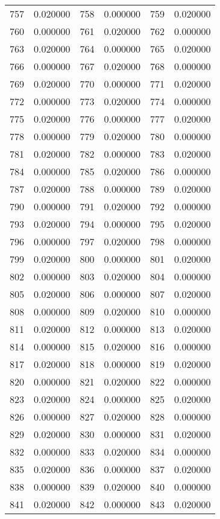 \documentclass[12pt]{article}
\begin{document}
\begin{longtable}{@{}cc|cc|cc@{}}
757 & 0.020000 & 758 & 0.000000 & 759 & 0.020000 \\
760 & 0.000000 & 761 & 0.020000 & 762 & 0.000000 \\
763 & 0.020000 & 764 & 0.000000 & 765 & 0.020000 \\
766 & 0.000000 & 767 & 0.020000 & 768 & 0.000000 \\
769 & 0.020000 & 770 & 0.000000 & 771 & 0.020000 \\
772 & 0.000000 & 773 & 0.020000 & 774 & 0.000000 \\
775 & 0.020000 & 776 & 0.000000 & 777 & 0.020000 \\
778 & 0.000000 & 779 & 0.020000 & 780 & 0.000000 \\
781 & 0.020000 & 782 & 0.000000 & 783 & 0.020000 \\
784 & 0.000000 & 785 & 0.020000 & 786 & 0.000000 \\
787 & 0.020000 & 788 & 0.000000 & 789 & 0.020000 \\
790 & 0.000000 & 791 & 0.020000 & 792 & 0.000000 \\
793 & 0.020000 & 794 & 0.000000 & 795 & 0.020000 \\
796 & 0.000000 & 797 & 0.020000 & 798 & 0.000000 \\
799 & 0.020000 & 800 & 0.000000 & 801 & 0.020000 \\
802 & 0.000000 & 803 & 0.020000 & 804 & 0.000000 \\
805 & 0.020000 & 806 & 0.000000 & 807 & 0.020000 \\
808 & 0.000000 & 809 & 0.020000 & 810 & 0.000000 \\
811 & 0.020000 & 812 & 0.000000 & 813 & 0.020000 \\
814 & 0.000000 & 815 & 0.020000 & 816 & 0.000000 \\
817 & 0.020000 & 818 & 0.000000 & 819 & 0.020000 \\
820 & 0.000000 & 821 & 0.020000 & 822 & 0.000000 \\
823 & 0.020000 & 824 & 0.000000 & 825 & 0.020000 \\
826 & 0.000000 & 827 & 0.020000 & 828 & 0.000000 \\
829 & 0.020000 & 830 & 0.000000 & 831 & 0.020000 \\
832 & 0.000000 & 833 & 0.020000 & 834 & 0.000000 \\
835 & 0.020000 & 836 & 0.000000 & 837 & 0.020000 \\
838 & 0.000000 & 839 & 0.020000 & 840 & 0.000000 \\
841 & 0.020000 & 842 & 0.000000 & 843 & 0.020000 \\

\end{longtable}
\end{document}
